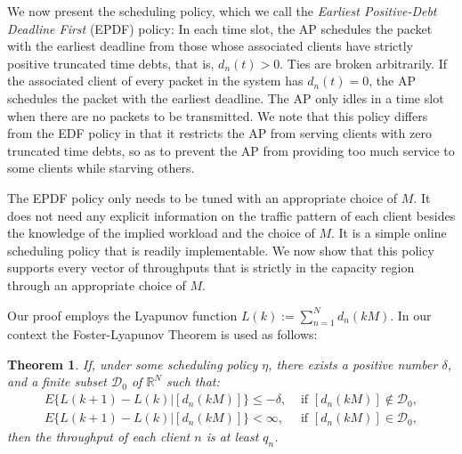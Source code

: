\documentclass[10pt,nocopyrightspace]{sigplan-proc-varsize-1in}
\newtheorem{theorem}{Theorem}
\begin{document}
We now present the scheduling policy, which we call the \emph{Earliest Positive-Debt Deadline First} (EPDF) policy: In each time slot, the AP schedules the packet with the earliest deadline from those whose associated clients have strictly positive truncated time debts, that is, $d_n(t)>0$. Ties are broken arbitrarily. If the associated client of every packet in the system has $d_n(t)=0$, the AP schedules the packet with the earliest deadline. The AP only idles in a time slot when there are no packets to be transmitted. We note that this policy differs from the EDF policy in that it restricts the AP from serving clients with zero truncated time debts, so as to prevent the AP from providing too much service to some clients while starving others.

The EPDF policy only needs to be tuned with an appropriate choice of $M$. It does not need any explicit information on the traffic pattern of each client besides the knowledge of the implied workload and the choice of $M$. It is a simple online scheduling policy that is readily implementable. We now show that this policy supports every vector of throughputs that is strictly in the capacity region through an appropriate choice of $M$. 

Our proof employs the Lyapunov function $L(k):=\sum_{n=1}^Nd_n(kM)$. In our context the Foster-Lyapunov Theorem is used as follows:

\begin{theorem}\label{theorem:scheduling:lyapunov}
If, under some scheduling policy $\eta$, there exists a positive number $\delta$, and a finite subset $\mathcal{D}_0$ of $\mathbb{R}^N$ such that:
\begin{align}
E\{L(k+1)-L(k)|[d_n(kM)]\} \leq -\delta,&\mbox{ if $[d_n(kM)]\notin \mathcal{D}_0$},\\
E\{L(k+1)-L(k)|[d_n(kM)]\}<\infty, &\mbox{ if $[d_n(kM)]\in \mathcal{D}_0$},
\end{align}
then the throughput of each client $n$ is at least $q_n$.
\end{theorem}
\end{document}
